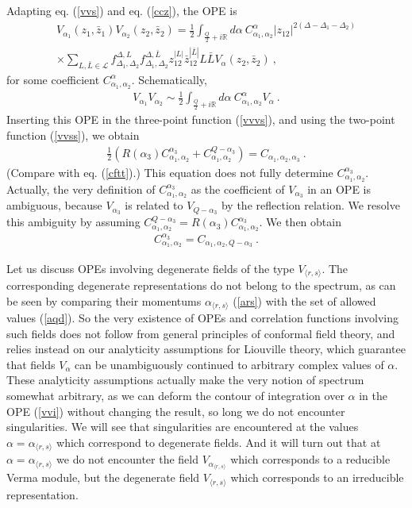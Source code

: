 \documentclass[12pt,a4paper,notitlepage]{report}
\newcommand \R {\mathbb{R}}
\numberwithin{equation}{section}
\theoremstyle{break}
\begin{document}
Adapting eq. (\ref{vvs}) and eq. (\ref{ccz}), the OPE is  
\begin{multline}
 V_{\alpha_1}(z_1,\bar{z}_1) V_{\alpha_2}(z_2,\bar{z}_2) = \frac12 \int_{\frac{Q}{2}+i\R} d\alpha\ C_{\alpha_1,\alpha_2}^\alpha |z_{12}|^{2(\Delta-\Delta_1-\Delta_2)} 
\\ \times 
\sum_{L,\bar{L}\in \mathcal{L}} f_{\Delta_1,\Delta_2}^{\Delta,L} f_{\Delta_1,\Delta_2}^{\Delta,\bar{L}}z_{12}^{|L|} \bar{z}_{12}^{|\bar{L}|} L\bar{L} V_{\alpha}(z_2,\bar{z}_2) \ , 
\label{vvh}
\end{multline}
for some coefficient $C_{\alpha_1,\alpha_2}^\alpha$. Schematically,
\begin{align}
 \boxed{V_{\alpha_1}V_{\alpha_2} \sim \frac12\int_{\frac{Q}{2}+i\R} d\alpha\ C_{\alpha_1,\alpha_2}^{\alpha} V_\alpha}\ .
\label{vvi}
\end{align}
Inserting this OPE in the three-point function (\ref{vvvs}), and using the two-point function (\ref{vvss}), we obtain
\begin{align}
 \frac12\left(R(\alpha_3)C_{\alpha_1,\alpha_2}^{\alpha_3} + C_{\alpha_1,\alpha_2}^{Q-\alpha_3}\right) = C_{\alpha_1,\alpha_2,\alpha_3}
\ . 
\label{hcc}
\end{align}
(Compare with eq. (\ref{cftt}).) 
This equation does not fully determine $C_{\alpha_1,\alpha_2}^{\alpha_3}$. Actually, the very definition of $C_{\alpha_1,\alpha_2}^{\alpha_3}$ as the coefficient of $V_{\alpha_3}$ in an OPE is ambiguous, because $V_{\alpha_3}$ is related to $V_{Q-\alpha_3}$ by the reflection relation.
We  resolve this ambiguity by assuming $C_{\alpha_1,\alpha_2}^{Q-\alpha_3}=R(\alpha_3)C_{\alpha_1,\alpha_2}^{\alpha_3}$. We then obtain
\begin{align}
 \boxed{C_{\alpha_1,\alpha_2}^{\alpha_3} = C_{\alpha_1,\alpha_2,Q-\alpha_3}}\ .
\label{cec}
\end{align}

Let us discuss OPEs involving degenerate fields of the type $V_{\langle r,s \rangle}$. The corresponding degenerate representations do not belong to the spectrum, as can be seen by comparing their momentums $\alpha_{\langle r,s \rangle}$ (\ref{ars}) with the set of allowed values (\ref{aqd}). So the very existence of OPEs and correlation functions involving such fields does not follow from general principles of conformal field theory, and relies instead on our analyticity assumptions for Liouville theory, which guarantee that fields $V_\alpha$ can be unambiguously continued to arbitrary complex values of $\alpha$. 
These analyticity assumptions actually make the very notion of spectrum somewhat arbitrary, as we can deform the contour of integration over $\alpha$ in the OPE (\ref{vvi}) without changing the result, so long we do not encounter singularities. We will see that singularities are encountered at the values $\alpha=\alpha_{\langle r,s \rangle}$ which correspond to degenerate fields. And it will turn out that at $\alpha=\alpha_{\langle r,s \rangle}$ we do not encounter the field $V_{\alpha_{\langle r,s \rangle}}$ which corresponds to a reducible Verma module, but the degenerate field $V_{\langle r,s \rangle}$ which corresponds to an irreducible representation. 
\end{document}
